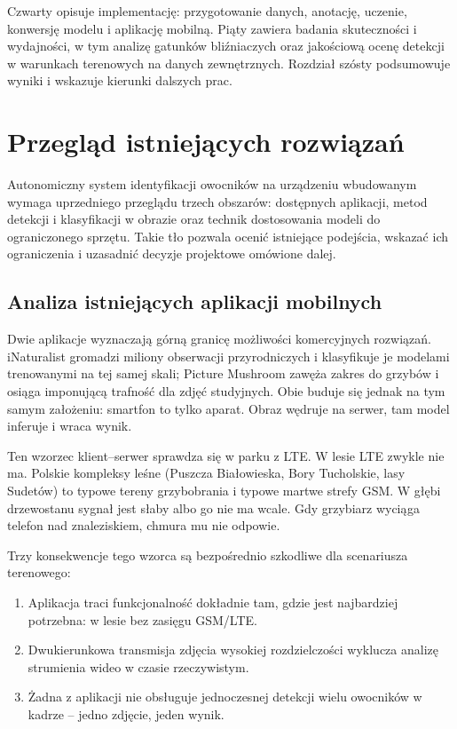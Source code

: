Czwarty opisuje implementację: przygotowanie danych, anotację, uczenie, konwersję modelu i aplikację mobilną. Piąty zawiera badania skuteczności i wydajności, w tym analizę gatunków bliźniaczych oraz jakościową ocenę detekcji w warunkach terenowych na danych zewnętrznych. Rozdział szósty podsumowuje wyniki i wskazuje kierunki dalszych prac.


\chapter{Przegląd istniejących rozwiązań}\label{chap:przeglad_rozwiazan}
Autonomiczny system identyfikacji owocników na urządzeniu wbudowanym wymaga uprzedniego przeglądu trzech obszarów: dostępnych aplikacji, metod detekcji i klasyfikacji w obrazie oraz technik dostosowania modeli do ograniczonego sprzętu. Takie tło pozwala ocenić istniejące podejścia, wskazać ich ograniczenia i uzasadnić decyzje projektowe omówione dalej.

\section{Analiza istniejących aplikacji mobilnych}
Dwie aplikacje wyznaczają górną granicę możliwości komercyjnych rozwiązań. iNaturalist \cite{inaturalist} gromadzi miliony obserwacji przyrodniczych i klasyfikuje je modelami trenowanymi na tej samej skali; Picture Mushroom \cite{picturemushroom} zawęża zakres do grzybów i osiąga imponującą trafność dla zdjęć studyjnych. Obie buduje się jednak na tym samym założeniu: smartfon to tylko aparat. Obraz wędruje na serwer, tam model inferuje i wraca wynik.

Ten wzorzec klient--serwer sprawdza się w parku z LTE. W lesie LTE zwykle nie ma. Polskie kompleksy leśne (Puszcza Białowieska, Bory Tucholskie, lasy Sudetów) to typowe tereny grzybobrania i typowe martwe strefy GSM. W głębi drzewostanu sygnał jest słaby albo go nie ma wcale. Gdy grzybiarz wyciąga telefon nad znaleziskiem, chmura mu nie odpowie.

Trzy konsekwencje tego wzorca są bezpośrednio szkodliwe dla scenariusza terenowego:
\begin{enumerate}
 \item Aplikacja traci funkcjonalność dokładnie tam, gdzie jest najbardziej potrzebna: w lesie bez zasięgu GSM/LTE.
 \item Dwukierunkowa transmisja zdjęcia wysokiej rozdzielczości wyklucza analizę strumienia wideo w czasie rzeczywistym.
 \item Żadna z aplikacji nie obsługuje jednoczesnej detekcji wielu owocników w kadrze -- jedno zdjęcie, jeden wynik.
\end{enumerate}


